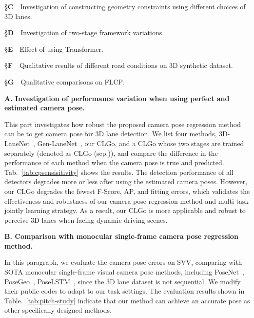 \documentclass[letterpaper]{article} \usepackage{aaai22}  \usepackage{times}  \usepackage{helvet}  \usepackage{courier}  \usepackage[hyphens]{url}  \usepackage{graphicx} \urlstyle{rm} \def\UrlFont{\rm}  \usepackage{natbib}  \usepackage{caption}
\begin{document}
\S \textbf{C}~~Investigation of constructing geometry constraints using different choices of 3D lanes.

\S \textbf{D}~~Investigation of two-stage framework variations.

\S \textbf{E}~~Effect of using Transformer.

\S \textbf{F}~~Qualitative results of different road conditions on 3D synthetic dataset.

\S \textbf{G}~~Qualitative comparisons on FLCP.


\noindent \textbf{A. Investigation of performance variation when using perfect and estimated camera pose.}

This part investigates how robust the proposed camera pose regression method can be to get camera pose for 3D lane detection.
We list four methods, 3D-LaneNet~\cite{3DLaneNet}, Gen-LaneNet~\cite{GenLaneNet}, our CLGo, and a CLGo whose two stages are trained separately (denoted as CLGo (sep.)), and compare the difference in the performance of each method when the camera pose is true and predicted.
Tab.~\ref{tab:cpsensisitivity} shows the results.
The detection performance of all detectors degrades more or less after using the estimated camera poses. However, our CLGo degrades the fewest F-Score, AP, and fitting errors, which validates the effectiveness and robustness of our camera pose regression method and multi-task jointly learning strategy. As a result, our CLGo is more applicable and robust to perceive 3D lanes when facing dynamic driving scenes.

\noindent \textbf{B. Comparison with monocular single-frame camera pose regression method.}

In this paragraph, we evaluate the camera pose errors on SVV, comparing with SOTA monocular single-frame visual camera pose methods, including PoseNet~\cite{Kendall2015ICCV}, PoseGeo~\cite{Kendall2017CVPR}, PoseLSTM~\cite{Walch2017ICCV}, since the 3D lane dataset is not sequential. We modify their public codes to adapt to our task settings.
The evaluation results shown in Table.~\ref{tab:pitch-study} indicate that our method can achieve an accurate pose as other specifically designed methods. 

\begin{table}[t]
\begin{center}
\caption{Quantitative comparisons of monocular single-frame camera pose regression method. Our CLGo achieves an accurate result as other specifically designed pose estimators.}
\label{tab:pitch-study}
\end{center}
\vspace{-1.5em}
\end{table}
\end{document}
